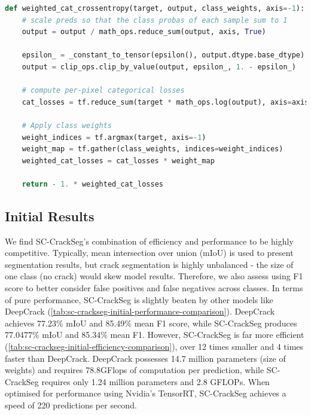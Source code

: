 \documentclass[a4paper,12pt]{report}
\begin{document}
\begin{lstlisting}[language=Python, caption=Weighted categorical crossentropy function in python using TensorFlow 2.1]
def weighted_cat_crossentropy(target, output, class_weights, axis=-1):
    # scale preds so that the class probas of each sample sum to 1
    output = output / math_ops.reduce_sum(output, axis, True)

    epsilon_ = _constant_to_tensor(epsilon(), output.dtype.base_dtype)
    output = clip_ops.clip_by_value(output, epsilon_, 1. - epsilon_)

    # compute per-pixel categorical losses
    cat_losses = tf.reduce_sum(target * math_ops.log(output), axis=axis)
    
    # Apply class weights
    weight_indices = tf.argmax(target, axis=-1)
    weight_map = tf.gather(class_weights, indices=weight_indices)
    weighted_cat_losses = cat_losses * weight_map
    
    return - 1. * weighted_cat_losses
\end{lstlisting}

\subsection{Initial Results}
We find SC-CrackSeg's combination of efficiency and performance to be highly competitive. Typically, mean intersection over union (mIoU) is used to present segmentation results, but crack segmentation is highly unbalanced - the size of one class (no crack) would skew model results. Therefore, we also assess using F1 score to better consider false positives and false negatives across classes. In terms of pure performance, SC-CrackSeg is slightly beaten by other models like DeepCrack (\autoref{tab:sc-crackseg-initial-performance-comparison}). DeepCrack achieves 77.23\% mIoU and 85.49\% mean F1 score, while SC-CrackSeg produces 77.0477\% mIoU and 85.34\% mean F1. However, SC-CrackSeg is far more efficient (\autoref{tab:sc-crackseg-initial-efficiency-comparison}), over 12 times smaller and 4 times faster than DeepCrack. DeepCrack possesses 14.7 million parameters (size of weights) and requires 78.8GFlops of computation per prediction, while SC-CrackSeg requires only 1.24 million parameters and 2.8 GFLOPs. When optimised for performance using Nvidia's TensorRT, SC-CrackSeg achieves a speed of 220 predictions per second.
\end{document}
